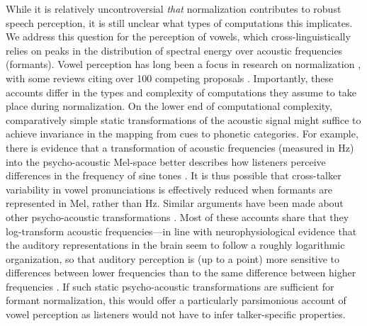 \documentclass[preprint]{JASA}
\begin{document}
While it is relatively uncontroversial \emph{that} normalization contributes to robust speech perception, it is still unclear what types of computations this implicates. We address this question for the perception of vowels, which cross-linguistically relies on peaks in the distribution of spectral energy over acoustic frequencies (formants). Vowel perception has long been a focus in research on normalization \citetext{\citealp[e.g.,][]{bladon1984}; \citealp{fant1975}; \citealp{gerstman1968}; \citealp{johnson2020}; \citealp{joos1948}; \citealp{lobanov1971}; \citealp{miller1989}; \citealp{nearey1978}; \citealp{nordstrom-lindblom1975}; \citealp{syrdal-gopal1986}; \citealp{traunmuller1981}; \citealp{watt-fabricius2002}; \citealp{zahorian-jagharghi1991}; \citealp[for review, see][]{barreda2020}}, with some reviews citing over 100 competing proposals \citep{carpenter-govindarajan1993}. Importantly, these accounts differ in the types and complexity of computations they assume to take place during normalization. On the lower end of computational complexity, comparatively simple static transformations of the acoustic signal might suffice to achieve invariance in the mapping from cues to phonetic categories. For example, there is evidence that a transformation of acoustic frequencies (measured in Hz) into the psycho-acoustic Mel-space better describes how listeners perceive differences in the frequency of sine tones \citetext{\citealp[e.g.,][]{fastl-zwicker2007}; \citealp{stevens-volkmann1940}; \citealp[for a critique, see][]{greenwood1997}; \citealp{siegel1965}}. It is thus possible that cross-talker variability in vowel pronunciations is effectively reduced when formants are represented in Mel, rather than Hz. Similar arguments have been made about other psycho-acoustic transformations \citetext{\citealp[e.g., Bark,][]{traunmuller1990}; \citealp[ERB,][]{glasberg-moore1990}; \citealp[or semitones,][]{fant2002}}. Most of these accounts share that they log-transform acoustic frequencies---in line with neurophysiological evidence that the auditory representations in the brain seem to follow a roughly logarithmic organization, so that auditory perception is (up to a point) more sensitive to differences between lower frequencies than to the same difference between higher frequencies \citetext{\citealp[e.g.,][]{merzenich1975}; \citealp[for review, see][]{saenz-langers2014}}. If such static psycho-acoustic transformations are sufficient for formant normalization, this would offer a particularly parsimonious account of vowel perception as listeners would not have to infer talker-specific properties.
\end{document}
